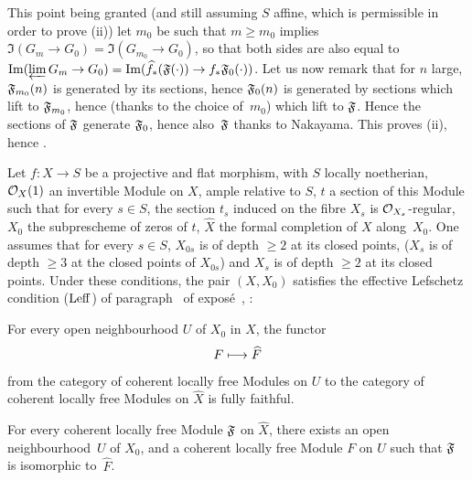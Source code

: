 This point being granted (and still assuming $S$ affine, which is permissible in order to prove  (ii)) let $m_0$ be such that $m\geq m_0$ implies $\Im(G_m\to G_0)= \Im(G_{m_0}\to G_0)$, so that both sides are also equal to $\Im(\varprojlim G_m\to G_0) = \Im(\widehat{f}_\ast(\formelF(\cdot))\to f_\ast\formelF_0(\cdot))$. Let us now remark that for $n$ large, $\mathfrak{F}_{m_0}(n)$ is generated by its sections, hence $\mathfrak{F}_0(n)$ is generated by sections which lift to $\mathfrak{F}_{m_0}$, hence (thanks to the choice of~$m_0$) which lift to $\mathfrak{F}$. Hence the sections of $\mathfrak{F}$ generate $\mathfrak{F}_0$, hence also~$\mathfrak{F}$ thanks to Nakayama. This proves  (ii), hence .

\begin{corollary} \label{XII.3.4}
Let $f:X\to S$ be a projective and flat morphism, with $S$ locally noetherian, $\mathcal{O}_X(1)$ an invertible Module on $X$, ample relative to $S$, $t$ a section of this Module such that for every $s\in S$, the section $t_s$ induced on the fibre $X_s$ is ${\mathcal O}_{X_s}$-regular, $X_0$ the subprescheme of zeros of $t$, $\widehat{X}$ the formal completion of $X$ along~$X_0$. One assumes that for every $s\in S$, $X_{0s}$ is of depth $\geq 2$ at its closed points, (\ie $X_s$ is of depth $\geq 3$ at the closed points of $X_{0s}$) and $X_s$ is of depth $\geq 2$ at its closed points. Under these conditions, the pair $(X, X_0)$ satisfies the effective Lefschetz condition ($\operatorname{Leff}$) of paragraph~ of expos\'e~\emph{}, \ie:
\begin{enumeratea}
\item
For every open neighbourhood $U$ of $X_0$ in $X$, the functor
\[
F \mto \widehat{F}
\]
from the category of coherent locally free Modules on $U$ to the category of coherent locally free Modules on $\widehat{X}$ is fully faithful.
\item
For every coherent locally free Module $\mathfrak{F}$ on $\widehat{X}$, there exists an open neighbourhood~$U$ of $X_0$, and a coherent locally free Module $F$ on $U$ such that $\mathfrak{F}$ is isomorphic to~$\widehat{F}$.
\end{enumeratea}
\end{corollary}

